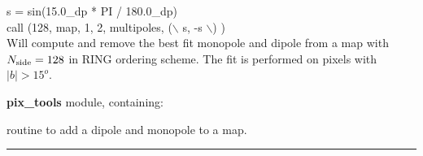 \newpage
\begin{example}
{
s = sin(15.0\_dp * PI / 180.0\_dp) \\
call \thedocid (128, map, 1, 2, multipoles, ($\backslash$ s, -s $\backslash$) )  \\
}
{
Will compute and remove the best fit monopole and dipole from a map with
$N_\mathrm{side}=128$ in RING ordering scheme. The fit is performed on pixels with $|b|>15^o$.
}
\end{example}

\begin{modules}
  \begin{sulist}{} %
  \item[\textbf{pix\_tools}] module, containing:
  \end{sulist}
\end{modules}

\begin{related}
  \begin{sulist}{} %
  \item[\htmlref{add\_dipole}{sub:add_dipole}] routine to add a dipole and
  monopole to a map.
  \end{sulist}
\end{related}

\rule{\hsize}{2mm}

\newpage
